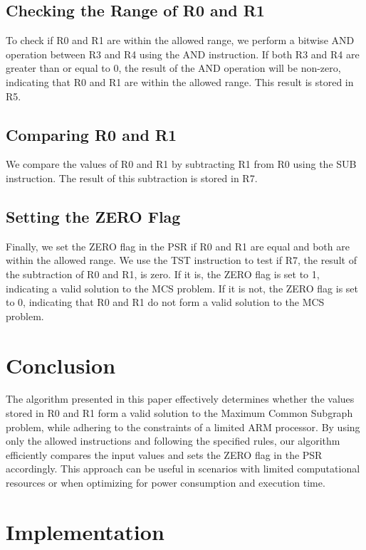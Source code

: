 \subsection{Checking the Range of R0 and R1}

To check if R0 and R1 are within the allowed range, we perform a bitwise AND operation between R3 and R4 using the AND instruction. If both R3 and R4 are greater than or equal to 0, the result of the AND operation will be non-zero, indicating that R0 and R1 are within the allowed range. This result is stored in R5.

\subsection{Comparing R0 and R1}

We compare the values of R0 and R1 by subtracting R1 from R0 using the SUB instruction. The result of this subtraction is stored in R7.

\subsection{Setting the ZERO Flag}

Finally, we set the ZERO flag in the PSR if R0 and R1 are equal and both are within the allowed range. We use the TST instruction to test if R7, the result of the subtraction of R0 and R1, is zero. If it is, the ZERO flag is set to 1, indicating a valid solution to the MCS problem. If it is not, the ZERO flag is set to 0, indicating that R0 and R1 do not form a valid solution to the MCS problem.

\section{Conclusion}

The algorithm presented in this paper effectively determines whether the values stored in R0 and R1 form a valid solution to the Maximum Common Subgraph problem, while adhering to the constraints of a limited ARM processor. By using only the allowed instructions and following the specified rules, our algorithm efficiently compares the input values and sets the ZERO flag in the PSR accordingly. This approach can be useful in scenarios with limited computational resources or when optimizing for power consumption and execution time.



\section{Implementation}

